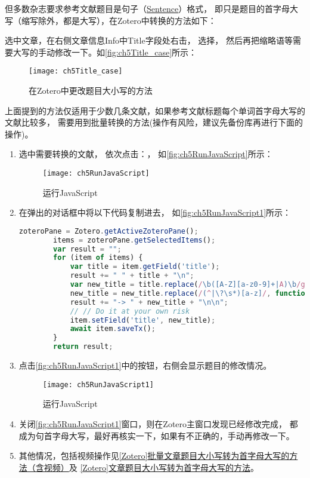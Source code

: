 \documentclass[theorem=false,mathfont=none,openany,sub3section]{easybook}
\begin{document}
{但多数杂志要求参考文献题目是句子（\href{https://www.grammarly.com/blog/title-case-sentence-case/}{Sentence}）格式，
即只是题目的首字母大写（缩写除外，都是大写），在Zotero中转换的方法如下：

选中文章，在右侧文章信息Info中Title字段处右击，
选择，
然后再把缩略语等需要大写的手动修改一下。如\autoref{fig:ch5Title_case}所示：

\begin{figure}[htbp]
	\centering
	\texttt{[image: ch5Title\_case]}
	\caption{在Zotero中更改题目大小写的方法}
	\label{fig:ch5Title_case}
\end{figure}


上面提到的方法仅适用于少数几条文献，如果参考文献标题每个单词首字母大写的文献比较多，
需要用到批量转换的方法(操作有风险，建议先备份库再进行下面的操作)。
\begin{enumerate}
	\item 选中需要转换的文献，
	依次点击：，
	如\autoref{fig:ch5RunJavaScript}所示：
	
	\begin{figure}[htbp]
		\centering
		\texttt{[image: ch5RunJavaScript]}
		\caption{运行JavaScript}
		\label{fig:ch5RunJavaScript}
	\end{figure}
	\item 在弹出的对话框中将以下代码复制进去，
	如\autoref{fig:ch5RunJavaScript1}所示：
	
	\begin{lstlisting}[language=JavaScript]
		zoteroPane = Zotero.getActiveZoteroPane();
		items = zoteroPane.getSelectedItems();
		var result = "";
		for (item of items) {
			var title = item.getField('title');
			result += " " + title + "\n";
			var new_title = title.replace(/\b([A-Z][a-z0-9]+|A)\b/g, function (x) { return x.toLowerCase(); });
			new_title = new_title.replace(/(^|\?\s*)[a-z]/, function (x) { return x.toUpperCase(); });
			result += "-> " + new_title + "\n\n";
			// // Do it at your own risk
			item.setField('title', new_title);
			await item.saveTx();
		}
		return result;
	\end{lstlisting}
	\item 点击\autoref{fig:ch5RunJavaScript1}中的按钮，右侧会显示题目的修改情况。
	\begin{figure}[htbp]
		\centering
		\texttt{[image: ch5RunJavaScript1]}
		\caption{运行JavaScript}
		\label{fig:ch5RunJavaScript1}
	\end{figure}
	\item 关闭\autoref{fig:ch5RunJavaScript1}窗口，则在Zotero主窗口发现已经修改完成，
	都成为句首字母大写，最好再核实一下，如果有不正确的，手动再修改一下。
	\item 其他情况，包括视频操作见\href{https://zhuanlan.zhihu.com/p/283889592}
	{[Zotero]批量文章题目大小写转为首字母大写的方法（含视频）}及
	\href{https://zhuanlan.zhihu.com/p/60651053}
	{[Zotero]文章题目大小写转为首字母大写的方法}。
\end{enumerate}

}
\end{document}
